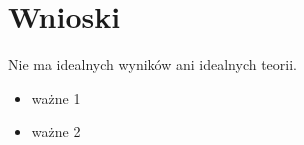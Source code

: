 \documentclass[a4paper,12pt]{article}
\begin{document}
\section{Wnioski}

Nie ma idealnych wyników ani idealnych teorii.

\begin{itemize}
  \item ważne 1
  \item ważne 2
  
\end{itemize}
\end{document}
